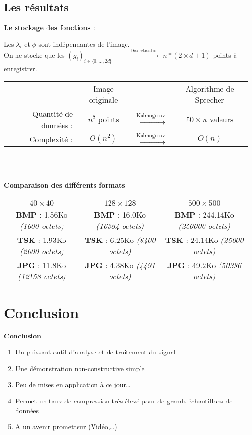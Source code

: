 \documentclass[8pt,a9paper]{beamer} \usepackage[utf8]{inputenc} \usepackage[francais]{babel} \usepackage[T1]{fontenc}
\newcommand{\titp}[1]{\begin{center}\large{\textbf{#1}}\end{center}}
\begin{document}
\subsection{Les résultats}
\begin{frame}
	\titp{Le stockage des fonctions :}
	Les $\lambda_i$ et $\phi$ sont indépendantes de l'image.\\
	On ne stocke que les $(g_i)_{i\in\lbrace 0,…,2d\rbrace} \hspace{1cm}\xrightarrow{\text{Discrétisation}}$ $n*(2\times d + 1)$ points à enregistrer.
	\textbf{\\}
	\begin{center}
	\begin{tabular}{rccc}
	\hline
	 & Image originale&\vline &Algorithme de Sprecher \\
	Quantité de données :& $n^2$ points & $\xrightarrow{\text{Kolmogorov}}$& $50\times n$ valeurs\\
	Complexité :& $O(n^2)$& $\xrightarrow{\text{Kolmogorov}}$& $O(n)$\\\hline
	\end{tabular}
	\end{center}
	\renewcommand{\arraystretch}{1.5}
	\setlength\doublerulesep{3pt}
	\textbf{\\}\textbf{\\}
	\titp{Comparaison des différents formats}
	\small{
		\begin{tabular}{c|c|c}
			$40\times 40$ & $128\times 128$ & $500\times 500$ \\
		\hline
			\cellcolor{vertpale}  \textbf{BMP} : 1.56Ko \textit{(1600 octets)} &\cellcolor{rougepale} \textbf{BMP} : 16.0Ko \textit{(16384 octets)}&\cellcolor{rougepale} \textbf{BMP} : 244.14Ko \textit{(250000 octets)}\\
		\hline
			\cellcolor{jaunepale} \textbf{TSK} : 1.93Ko \textit{(2000 octets)} &\cellcolor{jaunepale} \textbf{TSK} : 6.25Ko \textit{(6400 octets)}&\cellcolor{vertpale} \textbf{TSK} : 24.14Ko \textit{(25000 octets)}\\
		\hline
			\cellcolor{rougepale} \textbf{JPG} : 11.8Ko \textit{(12158 octets)}&\cellcolor{vertpale} \textbf{JPG} : 4.38Ko \textit{(4491 octets)}&\cellcolor{jaunepale} \textbf{JPG} : 49.2Ko \textit{(50396 octets)}\\
		\end{tabular}}
\end{frame}
\section*{Conclusion}
\begin{frame}
	\titp{Conclusion}
	\begin{enumerate}
		\item Un puissant outil d'analyse et de traitement du signal
		\item Une démonstration non-constructive simple
		\item Peu de mises en application à ce jour…
		\item Permet un taux de compression très élevé pour de grands échantillons de données
		\item A un avenir prometteur (Vidéo,…)
	\end{enumerate}
\end{frame}
\end{document}
